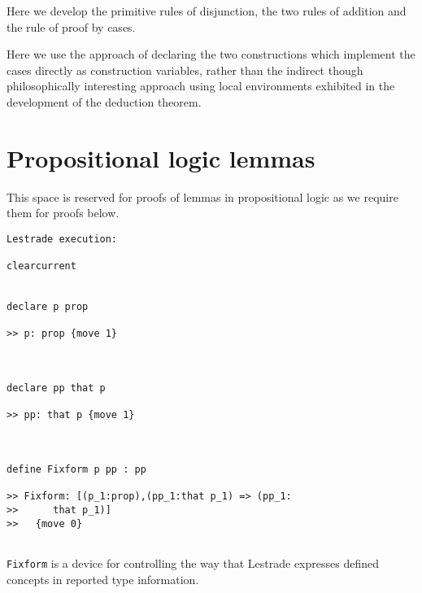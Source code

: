 \documentclass[12pt]{article}
\begin{document}
Here we develop the primitive rules of disjunction, the two rules of addition and the rule of proof by cases.

Here we use the approach of declaring the two constructions which implement the cases directly as construction variables, rather than the indirect though philosophically interesting approach using local environments exhibited in the development of the deduction theorem.

\section{Propositional logic lemmas}

This space is reserved for proofs of lemmas in propositional logic as we require them for proofs below.

\begin{verbatim}Lestrade execution:

clearcurrent


declare p prop

>> p: prop {move 1}



declare pp that p

>> pp: that p {move 1}



define Fixform p pp : pp

>> Fixform: [(p_1:prop),(pp_1:that p_1) => (pp_1:
>>      that p_1)]
>>   {move 0}


\end{verbatim}

{\tt Fixform} is a device for controlling the way that Lestrade expresses defined concepts in reported type information.
\end{document}
